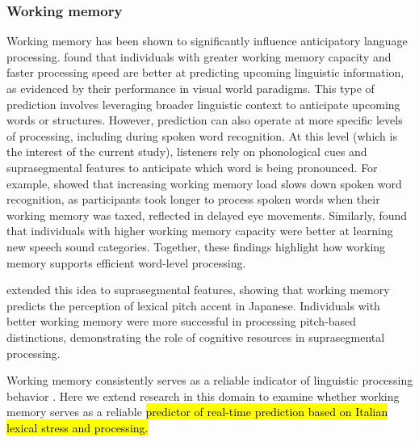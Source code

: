 \subsubsection{Working memory}
Working memory has been shown to significantly influence anticipatory language processing. \cite{Huettig2016} found that individuals with greater working memory capacity and faster processing speed are better at predicting upcoming linguistic information, as evidenced by their performance in visual world paradigms. This type of prediction involves leveraging broader linguistic context to anticipate upcoming words or structures. However, prediction can also operate at more specific levels of processing, including during spoken word recognition. At this level (which is the interest of the current study), listeners rely on phonological cues and suprasegmental features to anticipate which word is being pronounced. For example, \cite{hadar_2016} showed that increasing working memory load slows down spoken word recognition, as participants took longer to process spoken words when their working memory was taxed, reflected in delayed eye movements. Similarly, \cite{mchaney_et_al_2021_workingmemory} found that individuals with higher working memory capacity were better at learning new speech sound categories. Together, these findings highlight how working memory supports efficient word-level processing.

\cite{goss_2014} extended this idea to suprasegmental features, showing that working memory predicts the perception of lexical pitch accent in Japanese. Individuals with better working memory were more successful in processing pitch-based distinctions, demonstrating the role of cognitive resources in suprasegmental processing.


Working memory consistently serves as a reliable indicator of linguistic processing behavior \citep{mchaney_et_al_2021_workingmemory, goss_2014, hadar_2016}. Here we extend research in this domain to examine whether working memory serves as a reliable \hl{predictor of real-time prediction based on Italian lexical stress and processing.}


